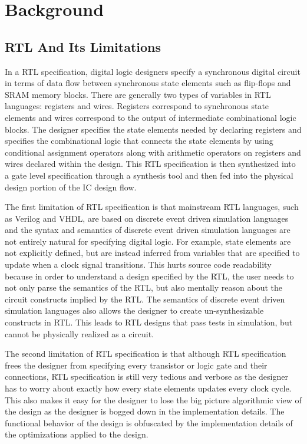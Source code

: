 \section{Background}
\subsection{RTL And Its Limitations}
\label{section:RTLCons}
In a RTL specification, digital logic designers specify a synchronous digital circuit in terms of data flow between synchronous state elements such as flip-flops and SRAM memory blocks. There are generally two types of variables in RTL languages: registers and wires. Registers correspond to synchronous state elements and wires correspond to the output of intermediate combinational logic blocks. The designer specifies the state elements needed by declaring registers and specifies the combinational logic that connects the state elements by using conditional assignment operators along with arithmetic operators on registers and wires declared within the design. This RTL specification is then synthesized into a gate level specification through a synthesis tool and then fed into the physical design portion of the IC design flow. 

The first limitation of RTL specification is that mainstream RTL languages, such as Verilog and VHDL, are based on discrete event driven simulation languages and the syntax and semantics of discrete event driven simulation languages are not entirely natural for specifying digital logic. For example, state elements are not explicitly defined, but are instead inferred from variables that are specified to update when a clock signal transitions. This hurts source code readability because in order to understand a design specified by the RTL, the user needs to not only parse the semantics of the RTL, but also mentally reason about the circuit constructs implied by the RTL. The semantics of discrete event driven simulation languages also allows the designer to create un-synthesizable constructs in RTL. This leads to RTL designs that pass tests in simulation, but cannot be physically realized as a circuit.

The second limitation of RTL specification is that although RTL specification frees the designer from specifying every transistor or logic gate and their connections, RTL specification is still very tedious and verbose as the designer has to worry about exactly how every state elements updates every clock cycle. This also makes it easy for the designer to lose the big picture algorithmic view of the design as the designer is bogged down in the implementation details. The functional behavior of the design is obfuscated by the implementation details of the optimizations applied to the design.

